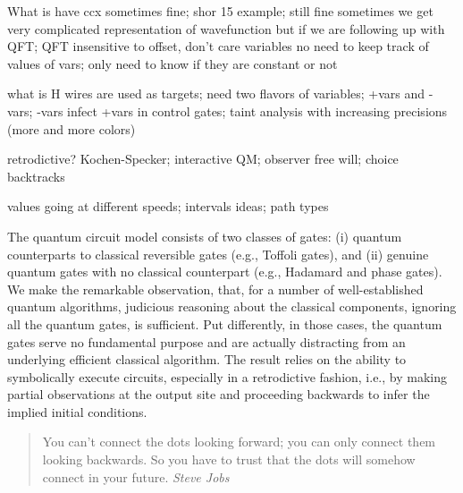\documentclass{article}
\begin{document}
  What is have ccx
  sometimes fine; shor 15 example; still fine
  sometimes we get very complicated representation of wavefunction
  but if we are following up with QFT; QFT insensitive to offset, don't care variables
  no need to keep track of values of vars; only need to know if they are constant or not

  what is H wires are used as targets; need two flavors of variables; +vars and -vars;
  -vars infect +vars in control gates; taint analysis with increasing precisions (more
  and more colors)

  retrodictive? Kochen-Specker; interactive QM; observer free will; choice backtracks

  values going at different speeds; intervals ideas; path types

  
The quantum circuit model consists of two classes of gates: (i)
quantum counterparts to classical reversible gates (e.g., Toffoli
gates), and (ii) genuine quantum gates with no classical counterpart
(e.g., Hadamard and phase gates). We make the remarkable observation,
that, for a number of well-established quantum algorithms, judicious
reasoning about the classical components, ignoring all the quantum
gates, is sufficient. Put differently, in those cases, the quantum
gates serve no fundamental purpose and are actually distracting from
an underlying efficient classical algorithm. The result relies on the
ability to symbolically execute circuits, especially in a retrodictive
fashion, i.e., by making partial observations at the output site and
proceeding backwards to infer the implied initial conditions.


\begin{quote}
You can’t connect the dots looking forward; you can only connect them
looking backwards.  So you have to trust that the dots will somehow
connect in your future. \emph{Steve Jobs}
\end{quote}


\end{document}
